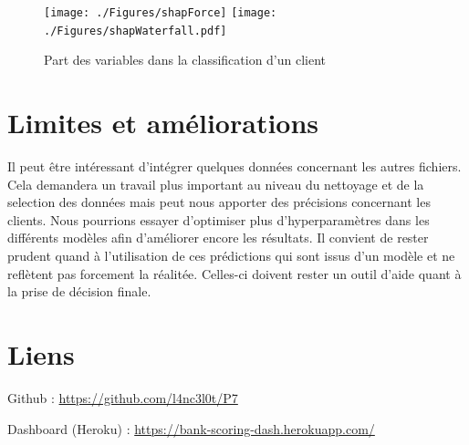 \documentclass[12pt, a4paper]{article}
\begin{document}
\begin{figure}[h]
    \begin{center}
        \texttt{[image: ./Figures/shapForce]}
        \texttt{[image: ./Figures/shapWaterfall.pdf]}
    \end{center}
    \caption{Part des variables dans la classification d'un client}
    \label{fig:shapWaterfall}
\end{figure}

\section{Limites et améliorations}

Il peut être intéressant d'intégrer quelques données concernant les autres fichiers.
Cela demandera un travail plus important au niveau du nettoyage et de la selection des données mais peut nous apporter des précisions concernant les clients. 
Nous pourrions essayer d'optimiser plus d'hyperparamètres dans les différents modèles afin d'améliorer encore les résultats.
Il convient de rester prudent quand à l'utilisation de ces prédictions qui sont issus d'un modèle et ne reflètent pas forcement la réalitée. Celles-ci doivent rester un outil d'aide quant à la prise de décision finale.

\section*{Liens}
 Github : \url{https://github.com/l4nc3l0t/P7}
 
 Dashboard (Heroku) : \url{https://bank-scoring-dash.herokuapp.com/}
\end{document}
